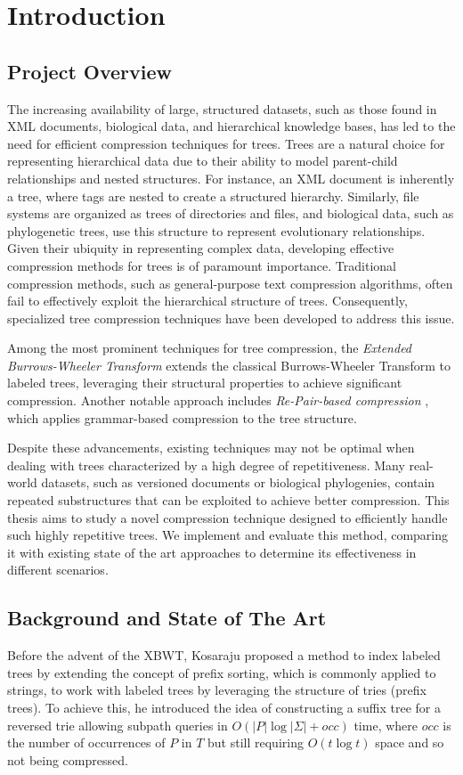 \chapter{Introduction} \label{chp:introduction}
\section{Project Overview}
The increasing availability of large, structured datasets, such as those found in XML documents, biological data, and hierarchical knowledge bases, has led to the need for efficient compression techniques for trees.
Trees are a natural choice for representing hierarchical data due to their ability to model parent-child relationships and nested structures. For instance, an XML document is inherently a tree, where tags are nested to create a structured hierarchy. Similarly, file systems are organized as trees of directories and files, and biological data, such as phylogenetic trees, use this structure to represent evolutionary relationships. Given their ubiquity in representing complex data, developing effective compression methods for trees is of paramount importance.
Traditional compression methods, such as general-purpose text compression algorithms, often fail to effectively exploit the hierarchical structure of trees. Consequently, specialized tree compression techniques have been developed to address this issue.

Among the most prominent techniques for tree compression, the \textit{Extended Burrows-Wheeler Transform} \cite{ferragina2009compressing} extends the classical Burrows-Wheeler Transform to labeled trees, leveraging their structural properties to achieve significant compression. Another notable approach includes \textit{Re-Pair-based compression} \cite{lohrey2011tree}, which applies grammar-based compression to the tree structure. 

Despite these advancements, existing techniques may not be optimal when dealing with trees characterized by a high degree of repetitiveness. Many real-world datasets, such as versioned documents or biological phylogenies, contain repeated substructures that can be exploited to achieve better compression. This thesis aims to study a novel compression technique designed to efficiently handle such highly repetitive trees. We implement and evaluate this method, comparing it with existing state of the art approaches to determine its effectiveness in different scenarios.

\section{Background and State of The Art} \label{sec:background}
Before the advent of the XBWT, Kosaraju \cite{kosaraju1989efficient} proposed a method to index labeled trees by extending the concept of prefix sorting, which is commonly applied to strings, to work with labeled trees by leveraging the structure of tries (prefix trees). To achieve this, he introduced the idea of constructing a suffix tree for a reversed trie allowing subpath queries in $O(|P|\log|\Sigma|+ occ)$ time, where $occ$ is the number of occurrences of $P$ in $T$ but still requiring $O(t \log t)$ space and so not being compressed.

